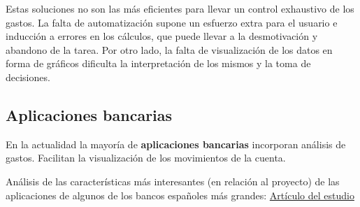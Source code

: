 Estas soluciones no son las más eficientes para llevar un control exhaustivo de los gastos. La falta de automatización supone un esfuerzo extra para el usuario e inducción a errores en los cálculos, que puede llevar a la desmotivación y abandono de la tarea. Por otro lado, la falta de visualización de 
los datos en forma de gráficos dificulta la interpretación de los mismos y la toma de decisiones.

\subsection{Aplicaciones bancarias}
En la actualidad la mayoría de \textbf{aplicaciones bancarias} incorporan análisis de gastos. 
Facilitan la visualización de los movimientos de la cuenta. 

Análisis de las características más interesantes (en relación al proyecto) 
de las aplicaciones de algunos de los bancos españoles más grandes:
\href{https://es.wikipedia.org/wiki/Anexo:Bancos_de_España}{Artículo del estudio}

